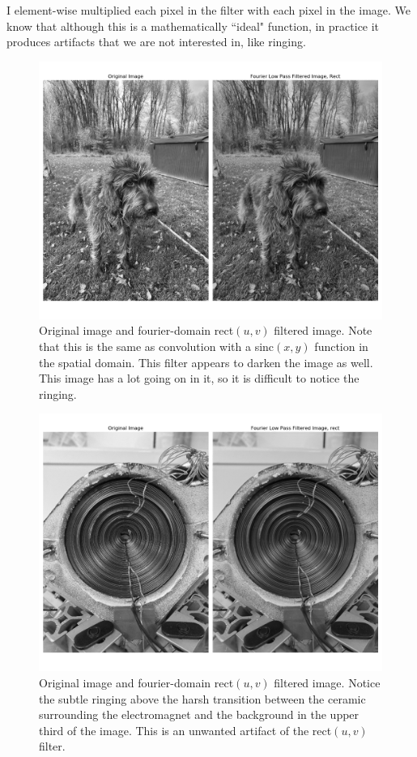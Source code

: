 \documentclass[]{article}
\begin{document}
	
	I element-wise multiplied each pixel in the filter with each pixel in the image. We know that although this is a mathematically ``ideal" function, in practice it produces artifacts that we are not interested in, like ringing. 
	
	\begin{figure}[H]
		\centering
		\includegraphics[width=5.25in]{p1_output/img_0_f_rect.png}
		\caption{Original image and fourier-domain rect$(u,v)$ filtered image. Note that this is the same as convolution with a sinc$(x,y)$ function in the spatial domain. This filter appears to darken the image as well. This image has a lot going on in it, so it is difficult to notice the ringing.}
	\end{figure}

	\begin{figure}[H]
		\centering
		\includegraphics[width=6.5in]{p1_output/img_1_f_rect.png}
		\caption{Original image and fourier-domain rect$(u,v)$ filtered image. Notice the subtle ringing above the harsh transition between the ceramic surrounding the electromagnet and the background in the upper third of the image. This is an unwanted artifact of the rect$(u,v)$ filter.}
	\end{figure}
	
\end{document}
